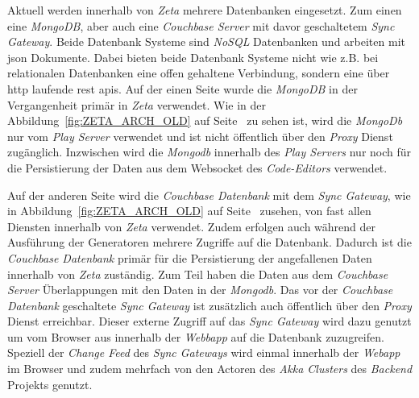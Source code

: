 Aktuell werden innerhalb von \textit{Zeta} mehrere Datenbanken eingesetzt. Zum einen eine \textit{MongoDB}, aber auch eine \textit{Couchbase Server} mit davor geschaltetem \textit{Sync Gateway}. Beide Datenbank Systeme sind \textit{NoSQL} Datenbanken und arbeiten mit \ac{json} Dokumente. Dabei bieten beide Datenbank Systeme nicht wie z.B. bei relationalen Datenbanken eine offen gehaltene Verbindung, sondern eine über \ac{http} laufende \ac{rest} \acp{api}. Auf der einen Seite wurde die \textit{MongoDB} in der Vergangenheit primär in \textit{Zeta} verwendet. Wie in der Abbildung~\ref{fig:ZETA_ARCH_OLD} auf Seite~\pageref{fig:ZETA_ARCH_OLD} zu sehen ist, wird die \textit{MongoDb} nur vom \textit{Play Server} verwendet und ist nicht öffentlich über den \textit{Proxy} Dienst zugänglich. Inzwischen wird die \textit{Mongodb} innerhalb des \textit{Play Servers} nur noch für die Persistierung der Daten aus dem Websocket des \textit{Code-Editors} verwendet.

Auf der anderen Seite wird die \textit{Couchbase Datenbank} mit dem \textit{Sync Gateway}, wie in Abbildung~\ref{fig:ZETA_ARCH_OLD} auf Seite~\pageref{fig:ZETA_ARCH_OLD} zusehen, von fast allen Diensten innerhalb von \textit{Zeta} verwendet. Zudem erfolgen auch während der Ausführung der Generatoren mehrere Zugriffe auf die Datenbank. Dadurch ist die \textit{Couchbase Datenbank} primär für die Persistierung der angefallenen Daten innerhalb von \textit{Zeta} zuständig. Zum Teil haben die Daten aus dem \textit{Couchbase Server} Überlappungen mit den Daten in der \textit{Mongodb}. Das vor der \textit{Couchbase Datenbank} geschaltete \textit{Sync Gateway} ist zusätzlich auch öffentlich über den \textit{Proxy} Dienst erreichbar. Dieser externe Zugriff auf das \textit{Sync Gateway} wird dazu genutzt um vom Browser aus innerhalb der \textit{Webbapp} auf die Datenbank zuzugreifen. Speziell der \textit{Change Feed} des \textit{Sync Gateways} wird einmal innerhalb der \textit{Webapp} im Browser und zudem mehrfach von den Actoren des \textit{Akka Clusters} des \textit{Backend} Projekts genutzt.

